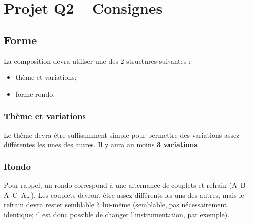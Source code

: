 \documentclass[11pt]{scrreprt}
\begin{document}
%
%
\setcounter{secnumdepth}{0}
\chapter*{Projet Q2 -- Consignes}


\section{Forme}
La composition devra utiliser une des 2 structures suivantes :
\begin{itemize}
\item thème et variations;
\item forme rondo.
\end{itemize}

\subsection{Thème et variations}
Le thème devra être suffisamment simple pour permettre des variations assez différentes les unes des autres. Il y aura au moins \textbf{3 variations}.

\subsection{Rondo}
Pour rappel, un rondo correspond à une alternance de couplets et refrain (A--B--A--C--A…). Les couplets devront être assez différents les uns des autres, mais le refrain devra rester semblable à lui-même (semblable, pas nécessairement identique; il est donc possible de changer l'instrumentation, par exemple).
\end{document}
